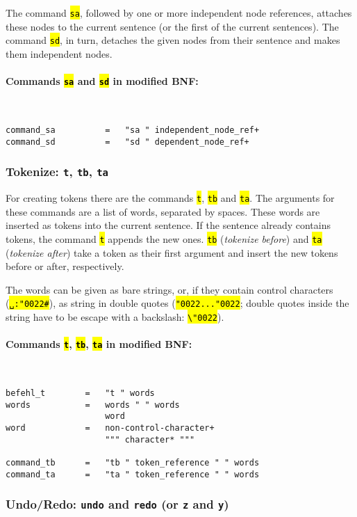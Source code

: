 \documentclass[12pt]{scrartcl}
\newcommand{\quo}{\char"0022}
\newcommand{\code}[1]{\hl{\texttt{#1}}}
\begin{document}
The command \code{sa}, followed by one or more independent node references, attaches these nodes to the current sentence (or the first of the current sentences).
The command \code{sd}, in turn, detaches the given nodes from their sentence and makes them independent nodes.

\paragraph*{Commands \code{sa} and \code{sd} in modified BNF:}
~
\begin{lstlisting}
command_sa          =   "sa " independent_node_ref+
command_sd          =   "sd " dependent_node_ref+
\end{lstlisting}


\subsubsection{Tokenize: \texttt{t}, \texttt{tb}, \texttt{ta}}

For creating tokens there are the commands \code{t}, \code{tb} and \code{ta}.
The arguments for these commands are a list of words, separated by spaces.
These words are inserted as tokens into the current sentence.
If the sentence already contains tokens, the command \code{t} appends the new ones.
\code{tb} (\textit{tokenize before}) and \code{ta} (\textit{tokenize after}) take a token as their first argument and insert the new tokens before or after, respectively.

The words can be given as bare strings, or, if they contain control characters (\code{␣:\quo\#}), as string in double quotes (\code{\quo...\quo}; double quotes inside the string have to be escape with a backslash: \code{\textbackslash\quo}).

\paragraph*{Commands \code{t}, \code{tb}, \code{ta} in modified BNF:}
~
\begin{lstlisting}
befehl_t        =   "t " words
words           =   words " " words
                    word
word            =   non-control-character+
                    """ character* """

command_tb      =   "tb " token_reference " " words
command_ta      =   "ta " token_reference " " words
\end{lstlisting}


\subsubsection{Undo/Redo: \texttt{undo} and \texttt{redo} (or \texttt{z} and \texttt{y})}\label{befehl-undo}
\end{document}
